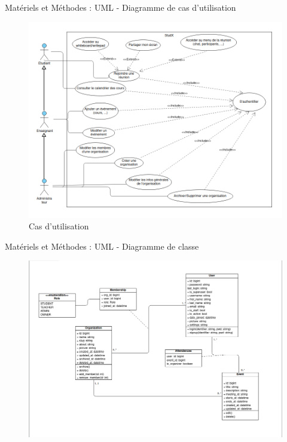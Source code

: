 \documentclass{beamer}
\begin{document}
\begin{frame}{Matériels et Méthodes : \small{UML} - \footnotesize{Diagramme de cas d'utilisation}}
  \begin{figure}[H]
    \centering
    \includegraphics[width=\textwidth]{../../images/use-cases-diag.png}
    \caption{Cas d'utilisation}
\end{figure}
\end{frame}

\begin{frame}{Matériels et Méthodes : \small{UML} - \footnotesize{Diagramme de classe}}
  \begin{figure}[H]
    \centering
    \includegraphics[width=\textwidth]{../../images/class-diag.png}
\end{figure}
\end{frame}
\end{document}
